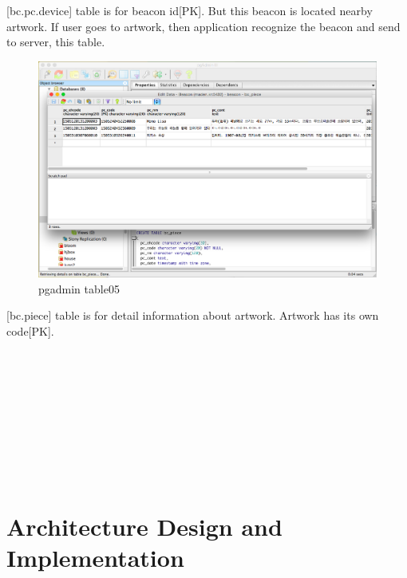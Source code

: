 \documentclass[conference]{IEEEtran}
\begin{document}
[bc.pc.device] table is for beacon id[PK]. But this beacon is located nearby artwork. If user goes to artwork, then application recognize the beacon and send to server, this table. \\

\begin{figure}[htbp]
\begin{center}
    \includegraphics[scale=0.2]{img_pgadmin005}
    \caption{pgadmin table05} 
\end{center}
\end{figure}

[bc.piece] table is for detail information about artwork. Artwork has its own code[PK]. \\\\\\\\\\\\\\\\\\\\

\section{Architecture Design and Implementation}
\end{document}
